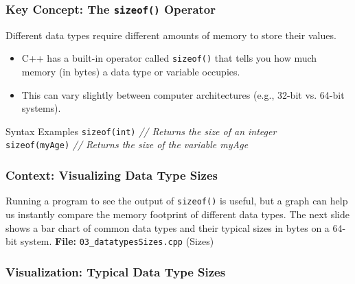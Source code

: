 \documentclass{beamer}
\begin{document}
\begin{frame}
\frametitle{Key Concept: The \texttt{sizeof()} Operator}
Different data types require different amounts of memory to store their values.

\begin{itemize}
    \item C++ has a built-in operator called \texttt{sizeof()} that tells you how much memory (in \alert{bytes}) a data type or variable occupies.
    \item This can vary slightly between computer architectures (e.g., 32-bit vs. 64-bit systems).
\end{itemize}
\pause
\begin{block}{Syntax Examples}
\texttt{sizeof(int)} \hfill \textit{// Returns the size of an integer} \\
\texttt{sizeof(myAge)} \hfill \textit{// Returns the size of the variable myAge}
\end{block}
\end{frame}

\begin{frame}
\frametitle{Context: Visualizing Data Type Sizes}
Running a program to see the output of \texttt{sizeof()} is useful, but a graph can help us instantly compare the memory footprint of different data types. The next slide shows a bar chart of common data types and their typical sizes in bytes on a 64-bit system.
\textbf{File:} \texttt{03\_datatypesSizes.cpp} (Sizes)
\end{frame}

\begin{frame}
\frametitle{Visualization: Typical Data Type Sizes}
\begin{figure}
\end{figure}
\end{frame}
\end{document}
